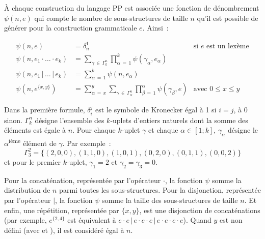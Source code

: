 À chaque construction du langage PP est associée une fonction de dénombrement
$\psi(n, e)$ qui compte le nombre de sous-structures de taille $n$ qu'il est
possible de générer pour la construction grammaticale $e$. Ainsi~:

\begin{align*}
%
\psi(n, e) & =
    \delta_n^1
    &
    \text{si $e$ est un lexème}
    \\
%
\psi(n, e_1 \cdot \dotso \cdot e_k) & =
    \sum_{\gamma \,\in\, \Gamma_k^n}
    \prod_{\alpha \,=\, 1}^k
    \psi(\gamma_\alpha, e_\alpha)
    \\
%
\psi(n, e_1 \,\vert\, \dots \,\vert\, e_k) & =
    \sum_{\alpha \,=\, 1}^k
    \psi(n, e_\alpha)
    \\
%
\psi(n, e^{\{x, y\}}) & =
    \sum_{\alpha \,=\, x}^y
    \sum_{\gamma \,\in\, \Gamma_\alpha^n}
    \prod_{\beta \,=\, 1}^\alpha
    \psi(\gamma_\beta, e)
    &
    \text{avec $0 \leq x \leq y$}
%
\end{align*}

Dans la première formule, $\delta_i^j$ est le symbole de Kronecker égal à 1 si
$i = j$, à 0 sinon. $\Gamma_k^n$ désigne l'ensemble des $k$-uplets d'entiers
naturels dont la somme des éléments est égale à $n$. Pour chaque $k$-uplet
$\gamma$ et chaque $\alpha \in [1; k]$, $\gamma_\alpha$ désigne le
$\alpha$\textsuperscript{ième} élément de $\gamma$.
%
Par exemple~:
%
$$\Gamma_3^2 = \{(2, 0, 0), (1, 1, 0), (1, 0, 1), (0, 2, 0), (0, 1, 1), (0, 0,
2)\}$$
%
et pour le premier $k$-uplet, $\gamma_1 = 2$ et $\gamma_2 = \gamma_3 = 0$.

Pour la concaténation, représentée par l'opérateur $\cdot$, la fonction $\psi$
somme la distribution de $n$ parmi toutes les sous-structures. Pour la
disjonction, représentée par l'opérateur $\vert$, la fonction $\psi$ somme la
taille des sous-structures de taille $n$. Et enfin, une répétition, représentée
par $\{x, y\}$, est une disjonction de concaténations (par exemple,
$e^{\{2,4\}}$ est équivalent à $e \cdot e \,\vert\, e \cdot e \cdot e \,\vert\,
e \cdot e \cdot e \cdot e$). Quand $y$ est non défini (avec \code{*} et
\code{+}), il est considéré égal à $n$.

